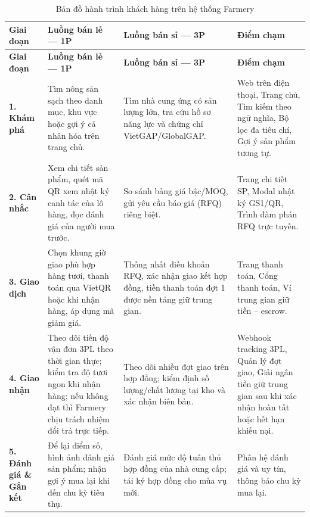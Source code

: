 \begingroup
\tblsetup\tblzebra
\begin{longtable}{L{2.15cm} L{3.77cm} L{3.77cm} L{4.85cm}}
\caption{Bản đồ hành trình khách hàng trên hệ thống Farmery}
\label{tab:customer-journey} \\
\toprule
{}
\textbf{Giai đoạn} & \textbf{Luồng bán lẻ --- 1P} & \textbf{Luồng bán sỉ --- 3P} & \textbf{Điểm chạm} \\
\midrule
\endfirsthead
\toprule
{}
\textbf{Giai đoạn} & \textbf{Luồng bán lẻ --- 1P} & \textbf{Luồng bán sỉ --- 3P} & \textbf{Điểm chạm} \\
\midrule
\endhead
\bottomrule
\endfoot
\textbf{1. Khám phá} &
Tìm nông sản sạch theo danh mục, khu vực hoặc gợi ý cá nhân hóa trên trang chủ. &
Tìm nhà cung ứng có sản lượng lớn, tra cứu hồ sơ năng lực và chứng chỉ VietGAP/GlobalGAP. &
Web trên điện thoại, Trang chủ, Tìm kiếm theo ngữ nghĩa, Bộ lọc đa tiêu chí, Gợi ý sản phẩm tương tự.\\
\textbf{2. Cân nhắc} &
Xem chi tiết sản phẩm, quét mã QR xem nhật ký canh tác của lô hàng, đọc đánh giá của người mua trước. &
So sánh bảng giá bậc/MOQ, gửi yêu cầu báo giá (RFQ) riêng biệt. &
Trang chi tiết SP, Modal nhật ký GS1/QR, Trình đàm phán RFQ trực tuyến.\\
\textbf{3. Giao dịch} &
Chọn khung giờ giao phù hợp hàng tươi, thanh toán qua VietQR hoặc khi nhận hàng, áp dụng mã giảm giá. &
Thống nhất điều khoản RFQ, xác nhận giao kết hợp đồng, tiền thanh toán đợt 1 được nền tảng giữ trung gian. &
Trang thanh toán, Cổng thanh toán, Ví trung gian giữ tiền -- escrow.\\
\textbf{4. Giao nhận} &
Theo dõi tiến độ vận đơn 3PL theo thời gian thực; kiểm tra độ tươi ngon khi nhận hàng; nếu không đạt thì Farmery chịu trách nhiệm đổi trả trực tiếp. &
Theo dõi nhiều đợt giao trên hợp đồng; kiểm định số lượng/chất lượng tại kho và xác nhận biên bản. &
Webhook tracking 3PL, Quản lý đợt giao, Giải ngân tiền giữ trung gian sau khi xác nhận hoàn tất hoặc hết hạn khiếu nại.\\
\textbf{5. Đánh giá \& Gắn kết} &
Để lại điểm số, hình ảnh đánh giá sản phẩm; nhận gợi ý mua lại khi đến chu kỳ tiêu thụ. &
Đánh giá mức độ tuân thủ hợp đồng của nhà cung cấp; tái ký hợp đồng cho mùa vụ mới. &
Phân hệ đánh giá và uy tín, thông báo chu kỳ mua lại.\\
\end{longtable}
\endgroup

